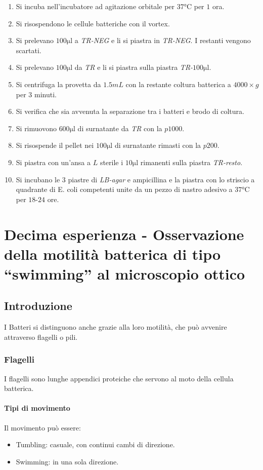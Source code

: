 \begin{enumerate}
			\item Si incuba nell'incubatore ad agitazione orbitale per $37\si{\celsius}$ per $1$ ora.
			\item Si risospendono le cellule batteriche con il vortex.
			\item Si prelevano $100\si{\micro\litre}$ a \emph{TR-NEG} e li si piastra in \emph{TR-NEG}.
				I restanti vengono scartati.
			\item Si prelevano $100\si{\micro\litre}$ da \emph{TR} e li si piastra sulla piastra \emph{TR-$100\si{\micro\litre}$}.
			\item Si centrifuga la provetta da $1.5\si{mL}$ con la restante coltura batterica a $4000\times g$ per $3$ minuti.
			\item Si verifica che sia avvenuta la separazione tra i batteri e brodo di coltura.
			\item Si rimuovono $600\si{\micro\litre}$ di surnatante da \emph{TR} con la $p1000$.
			\item Si risospende il pellet nei $100\si{\micro\litre}$ di surnatante rimasti con la $p200$.
			\item Si piastra con un'ansa a $L$ sterile i $10\si{\micro\litre}$ rimanenti sulla piastra \emph{TR-resto}.
			\item Si incubano le $3$ piastre di \emph{LB-agar} e ampicillina e la piastra con lo striscio a quadrante di E. coli competenti unite da un pezzo di nastro adesivo a $37\si{\celsius}$ per $18$-$24$ ore.
		\end{enumerate}
				

\section{Decima esperienza - Osservazione della motilit\`a batterica di tipo ``swimming'' al microscopio ottico}

	\subsection{Introduzione}
	I Batteri si distinguono anche grazie alla loro motilit\`a, che pu\`o avvenire attraverso flagelli o pili.

		\subsubsection{Flagelli}
		I flagelli sono lunghe appendici proteiche che servono al moto della cellula batterica.
							
			\paragraph{Tipi di movimento}
			Il movimento pu\`o essere:
			\begin{multicols}{2}
				\begin{itemize}
					\item Tumbling: casuale, con continui cambi di direzione.
					\item Swimming: in una sola direzione.
				\end{itemize}
			\end{multicols}

